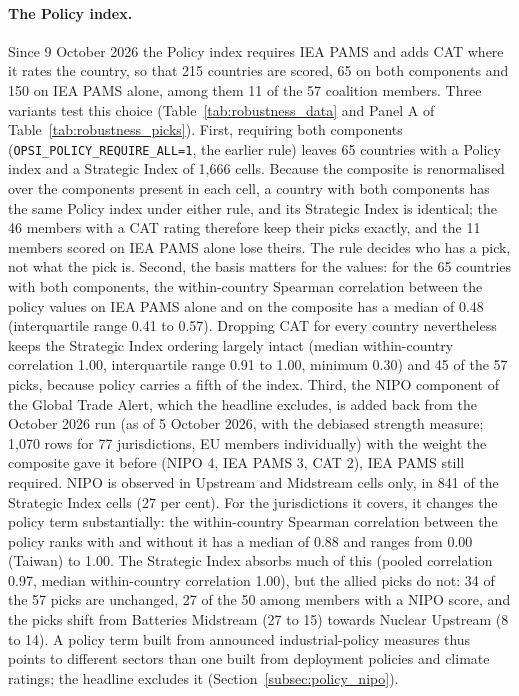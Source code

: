\paragraph{The Policy index.} Since 9 October 2026 the Policy index requires IEA PAMS and adds
CAT where it rates the country, so that 215 countries are scored, 65 on both components and
150 on IEA PAMS alone, among them 11 of the 57 coalition members. Three variants test this
choice (Table~\ref{tab:robustness_data} and Panel A of Table~\ref{tab:robustness_picks}). First,
requiring both components (\texttt{OPSI\_POLICY\_REQUIRE\_ALL=1}, the earlier rule) leaves 65
countries with a Policy index and a Strategic Index of 1{,}666 cells. Because the composite is
renormalised over the components present in each cell, a country with both components has the
same Policy index under either rule, and its Strategic Index is identical; the 46 members with a
CAT rating therefore keep their picks exactly, and the 11 members scored on IEA PAMS alone lose
theirs. The rule decides who has a pick, not what the pick is. Second, the basis matters for
the values: for the 65 countries with both components, the within-country Spearman correlation
between the policy values on IEA PAMS alone and on the composite has a median of 0.48
(interquartile range 0.41 to 0.57). Dropping CAT for every country nevertheless keeps the
Strategic Index ordering largely intact (median within-country correlation 1.00, interquartile
range 0.91 to 1.00, minimum 0.30) and 45 of the 57 picks, because policy carries a fifth of
the index. Third, the NIPO component of the Global Trade Alert, which the headline excludes,
is added back from the October 2026 run (as of 5 October 2026, with the debiased strength
measure; 1{,}070 rows for 77 jurisdictions, EU members individually) with the weight the
composite gave it before (NIPO 4, IEA PAMS 3, CAT 2), IEA PAMS still required. NIPO is observed
in Upstream and Midstream cells only, in 841 of the Strategic Index cells (27 per cent). For
the jurisdictions it covers, it changes the policy term substantially: the within-country
Spearman correlation between the policy ranks with and without it has a median of 0.88 and
ranges from 0.00 (Taiwan) to 1.00. The Strategic Index absorbs much of this (pooled correlation
0.97, median within-country correlation 1.00), but the allied picks do not: 34 of the 57 picks
are unchanged, 27 of the 50 among members with a NIPO score, and the picks shift from Batteries
Midstream (27 to 15) towards Nuclear Upstream (8 to 14). A policy term built from announced
industrial-policy measures thus points to different sectors than one built from deployment
policies and climate ratings; the headline excludes it (Section~\ref{subsec:policy_nipo}).

